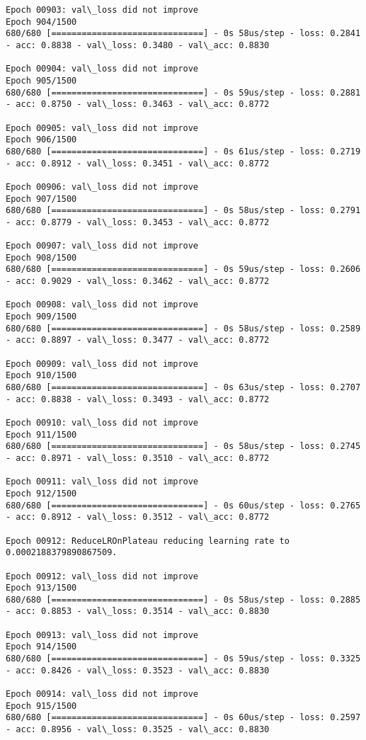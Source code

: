 \documentclass[11pt]{article}
\begin{document}
\begin{Verbatim}[commandchars=\\\{\}]
Epoch 00903: val\_loss did not improve
Epoch 904/1500
680/680 [==============================] - 0s 58us/step - loss: 0.2841 - acc: 0.8838 - val\_loss: 0.3480 - val\_acc: 0.8830

Epoch 00904: val\_loss did not improve
Epoch 905/1500
680/680 [==============================] - 0s 59us/step - loss: 0.2881 - acc: 0.8750 - val\_loss: 0.3463 - val\_acc: 0.8772

Epoch 00905: val\_loss did not improve
Epoch 906/1500
680/680 [==============================] - 0s 61us/step - loss: 0.2719 - acc: 0.8912 - val\_loss: 0.3451 - val\_acc: 0.8772

Epoch 00906: val\_loss did not improve
Epoch 907/1500
680/680 [==============================] - 0s 58us/step - loss: 0.2791 - acc: 0.8779 - val\_loss: 0.3453 - val\_acc: 0.8772

Epoch 00907: val\_loss did not improve
Epoch 908/1500
680/680 [==============================] - 0s 59us/step - loss: 0.2606 - acc: 0.9029 - val\_loss: 0.3462 - val\_acc: 0.8772

Epoch 00908: val\_loss did not improve
Epoch 909/1500
680/680 [==============================] - 0s 58us/step - loss: 0.2589 - acc: 0.8897 - val\_loss: 0.3477 - val\_acc: 0.8772

Epoch 00909: val\_loss did not improve
Epoch 910/1500
680/680 [==============================] - 0s 63us/step - loss: 0.2707 - acc: 0.8838 - val\_loss: 0.3493 - val\_acc: 0.8772

Epoch 00910: val\_loss did not improve
Epoch 911/1500
680/680 [==============================] - 0s 58us/step - loss: 0.2745 - acc: 0.8971 - val\_loss: 0.3510 - val\_acc: 0.8772

Epoch 00911: val\_loss did not improve
Epoch 912/1500
680/680 [==============================] - 0s 60us/step - loss: 0.2765 - acc: 0.8912 - val\_loss: 0.3512 - val\_acc: 0.8772

Epoch 00912: ReduceLROnPlateau reducing learning rate to 0.0002188379890867509.

Epoch 00912: val\_loss did not improve
Epoch 913/1500
680/680 [==============================] - 0s 58us/step - loss: 0.2885 - acc: 0.8853 - val\_loss: 0.3514 - val\_acc: 0.8830

Epoch 00913: val\_loss did not improve
Epoch 914/1500
680/680 [==============================] - 0s 59us/step - loss: 0.3325 - acc: 0.8426 - val\_loss: 0.3523 - val\_acc: 0.8830

Epoch 00914: val\_loss did not improve
Epoch 915/1500
680/680 [==============================] - 0s 60us/step - loss: 0.2597 - acc: 0.8956 - val\_loss: 0.3525 - val\_acc: 0.8830


\end{Verbatim}
\end{document}
